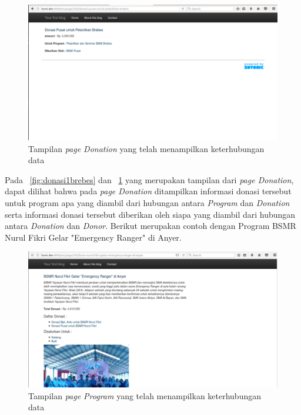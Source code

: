 \begin{figure}
	\centering
	\includegraphics[width=1\textwidth]
	{pics/53-donasipusatbrebes.png}
	\caption{Tampilan \textit{page Donation} yang telah menampilkan keterhubungan data}
	\label{fig:donasi2brebes}
\end{figure}
\vspace{-0.3cm}

Pada \pic~\ref{fig:donasi1brebes} dan \pic~\ref{fig:donasi2brebes} yang merupakan tampilan dari \textit{page Donation}, dapat dilihat bahwa pada \textit{page Donation} ditampilkan informasi donasi tersebut untuk program apa yang diambil dari hubungan antara \textit{Program} dan \textit{Donation} serta informasi donasi tersebut diberikan oleh siapa yang diambil dari hubungan antara \textit{Donation} dan \textit{Donor}. Berikut merupakan contoh dengan Program BSMR Nurul Fikri Gelar "Emergency Ranger" di Anyer. 

\begin{figure}
	\centering
	\includegraphics[width=1\textwidth]
	{pics/100-program.png}
	\caption{Tampilan \textit{page Program} yang telah menampilkan keterhubungan data}
	\label{fig:programlinked}
\end{figure}
\vspace{-0.3cm}

